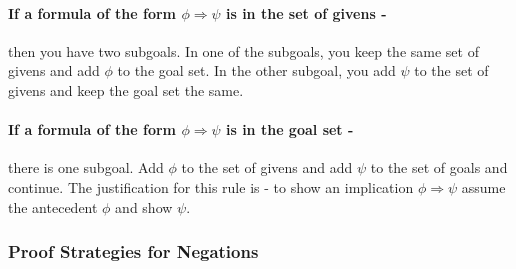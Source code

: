 \documentclass[11pt]{article}
\newcommand{\rbreak}{\ \\}
\newcommand{\NamedSequentRule}[3]{{\mbox{{\begin{tabular}{c} {\mbox{$#1$}}\vspace{.25em}\\ \hline \vspace{.25em} {\mbox{$#2$}} \end{tabular}}{\hspace{.5em}{#3}}}}}
\begin{document}
\paragraph{If a formula of the form $\phi\Rightarrow\psi$ is in the set of
  givens - } then you have two subgoals.  In one of the subgoals, you keep the
same set of givens and add $\phi$ to the goal set. In the other subgoal, you
add $\psi$ to the set of givens and keep the goal set the same.



\paragraph{If a formula of the form $\phi\Rightarrow\psi$ is in the goal set -
} there is one subgoal.  Add $\phi$ to the set of givens and add $\psi$ to the
set of goals and continue.  The justification for this rule is - to show an
implication $\phi\Rightarrow\psi$ assume the antecedent $\phi$ and show $\psi$.




\subsubsection{Proof Strategies for Negations}
\end{document}
